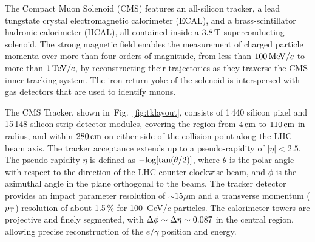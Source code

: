 \documentclass[a4paper]{jpconf}
\begin{document}
The Compact Muon Solenoid (CMS) features an all-silicon tracker, a lead tungstate crystal electromagnetic calorimeter (ECAL), and a brass-scintillator hadronic calorimeter (HCAL), all contained inside a  $3.8\,{\rm T}$  superconducting solenoid.
The strong magnetic field  enables the measurement of charged
particle momenta over more than four orders of magnitude, from less than
$100{\rm \, MeV}/c$ to more than $1{\rm \, TeV}/c$, by reconstructing their trajectories as they
traverse the CMS inner tracking system.  
The iron return yoke of the solenoid is interspersed with gas detectors that are used to identify muons.


The CMS Tracker, shown
in~Fig.~\ref{fig:tklayout}, consists of 1\,440 silicon pixel and 15\,148 silicon strip detector modules, covering
the region from $4\rm \, cm$ to $110\rm \, cm$ in radius, and within $280\rm \, cm$ on either
side of the collision point along the LHC beam axis. The tracker
acceptance extends up to a pseudo-rapidity of $\left | \eta \right | < 2.5$.
The pseudo-rapidity $\eta$ is defined as $\rm  -log[tan(\theta/2)]$, where $\theta$ is the polar angle with respect to the direction of the LHC counter-clockwise beam, and $\phi$ is the azimuthal angle in the plane orthogonal to the beams.
The tracker detector  provides an impact parameter resolution of $\sim 15 \mu$m and a transverse momentum ($p_{\rm T}$) resolution of about 1.5\,\% for 100~GeV/$c$ particles.
The calorimeter towers are projective and finely segmented, with $\rm \Delta\phi \sim \Delta\eta \sim 0.087$ in the central region, allowing precise reconstruction of the $e/\gamma$ position and energy.  
\end{document}
